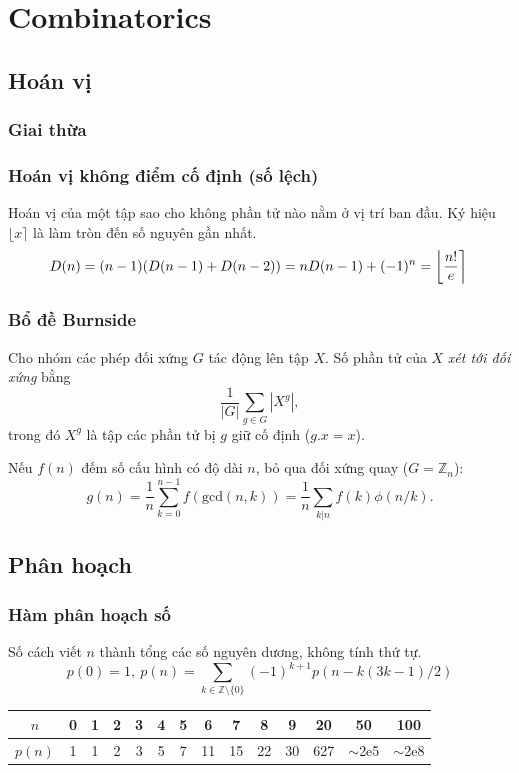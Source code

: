 \chapter{Combinatorics}

\section{Hoán vị}
	\subsection{Giai thừa}
		

	\subsection{Hoán vị không điểm cố định (số lệch)}
		Hoán vị của một tập sao cho không phần tử nào nằm ở vị trí ban đầu. Ký hiệu $\lfloor x \rceil$ là làm tròn đến số nguyên gần nhất.
		\[ \mkern-2mu D(n) = (n-1)(D(n-1)+D(n-2)) = n D(n-1)+(-1)^n = \left\lfloor\frac{n!}{e}\right\rceil \]

	\subsection{Bổ đề Burnside}
		Cho nhóm các phép đối xứng $G$ tác động lên tập $X$. Số phần tử của $X$ \emph{xét tới đối xứng} bằng
		 \[ {\frac {1}{|G|}}\sum _{{g\in G}}|X^{g}|, \]
		 trong đó $X^{g}$ là tập các phần tử bị $g$ giữ cố định ($g.x = x$).

		 Nếu $f(n)$ đếm số cấu hình có độ dài $n$, bỏ qua đối xứng quay ($G = \mathbb Z_n$):
		 \[ g(n) = \frac 1 n \sum_{k=0}^{n-1}{f(\text{gcd}(n, k))} = \frac 1 n \sum_{k|n}{f(k)\phi(n/k)}. \]

\section{Phân hoạch}
	\subsection{Hàm phân hoạch số}
		Số cách viết $n$ thành tổng các số nguyên dương, không tính thứ tự.
		\[ p(0) = 1,\ p(n) = \sum_{k \in \mathbb Z \setminus \{0\}}{(-1)^{k+1} p(n - k(3k-1) / 2)} \]

		\begin{center}
		\begin{tabular}{c|c@{\ }c@{\ }c@{\ }c@{\ }c@{\ }c@{\ }c@{\ }c@{\ }c@{\ }c@{\ }c@{\ }c@{\ }c}
			$n$    & 0 & 1 & 2 & 3 & 4 & 5 & 6  & 7  & 8  & 9  & 20  & 50  & 100 \\ \hline
			$p(n)$ & 1 & 1 & 2 & 3 & 5 & 7 & 11 & 15 & 22 & 30 & 627 & $\mathtt{\sim}$2e5 & $\mathtt{\sim}$2e8 \\
		\end{tabular}
		\end{center}

